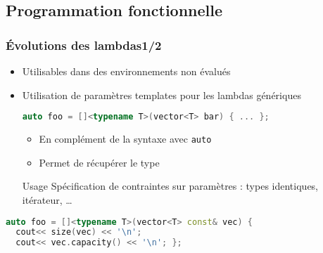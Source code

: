 \documentclass[C++.tex]{subfiles}
\begin{document}
\subsection*{Programmation fonctionnelle}
\begin{frame}[fragile]
	\frametitle{Évolutions des lambdas\titlehfill{}1/2}
	\begin{itemize}
		\item Utilisables dans des environnements non évalués
		\item Utilisation de paramètres templates pour les lambdas génériques

		\begin{lstlisting}[language=C++]
auto foo = []<typename T>(vector<T> bar) { ... };\end{lstlisting}

		\begin{itemize}
			\item En complément de la syntaxe avec \lstinline|auto|


			\item Permet de récupérer le type

		\end{itemize}

		\begin{block}{Usage}
			Spécification de contraintes sur paramètres : types identiques, itérateur, \ldots
		\end{block}
	\end{itemize}

	\begin{lstlisting}[language=C++]
auto foo = []<typename T>(vector<T> const& vec) { 
  cout<< size(vec) << '\n';
  cout<< vec.capacity() << '\n'; };\end{lstlisting}

\end{frame}
\end{document}
